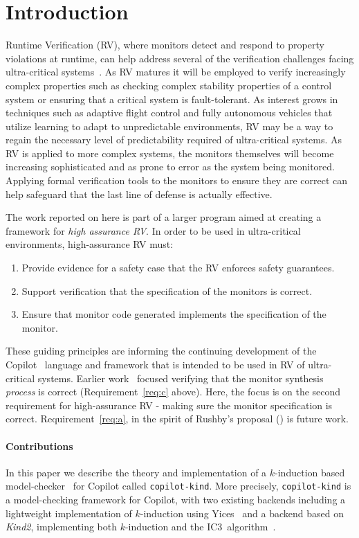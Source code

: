 \section{Introduction}\label{sec:intro}
Runtime Verification (RV), where monitors detect and respond to
property violations at runtime, can help address several of the
verification challenges facing ultra-critical
systems~\cite{pike-rv-11,rvRushby}.  As RV matures it will be employed to
verify increasingly complex properties such as checking complex
stability properties of a control system or ensuring that a critical
system is fault-tolerant. As interest grows in techniques
such as adaptive flight control and fully autonomous vehicles that
utilize learning to adapt to unpredictable environments, RV may be a
way to regain the necessary level of predictability required of
ultra-critical systems.  As RV is applied to more complex systems, the
monitors themselves will become increasing sophisticated and as prone to error
as the system being monitored.  Applying formal verification
tools to the monitors to ensure they are correct can help safeguard
that the last line of defense is actually effective.

 The work reported on here is part of a larger
program aimed at creating a framework for \emph{high assurance RV}. In
order to be used in ultra-critical environments, high-assurance RV
must:
\begin{enumerate}
\item \label{req:a} Provide evidence for a safety case that the RV enforces safety guarantees.
\item \label{req:b} Support verification that the specification of the monitors
  is correct.
\item \label{req:c} Ensure that monitor code generated implements the specification of the
monitor.
\end{enumerate}

\noindent
These guiding principles are informing the continuing development of the
Copilot~\cite{copilot,pike-isse-13} language and framework that is intended to
be used in RV of ultra-critical systems.  Earlier work~\cite{pike-icfp-12}
focused verifying that the monitor synthesis \emph{process} is correct
(Requirement~\ref{req:c} above). Here, the focus
is on the second requirement for high-assurance RV - making sure the monitor
specification is correct. Requirement~\ref{req:a}, in the spirit of Rushby's
proposal (\cite{rvRushby}) is future work.

\paragraph{Contributions}
In this paper we describe the theory and implementation of a $k$-induction based
model-checker~\cite{Sheeran00,EenS03} for Copilot called
\texttt{copilot-kind}. More precisely, \texttt{copilot-kind} is a model-checking
framework for Copilot, with two existing backends including a lightweight
implementation of $k$-induction using Yices~\cite{Dutertre:cav2014} and a backend based on
\emph{Kind2}, implementing both $k$-induction and the IC3~algorithm~\cite{Somenzi-FMCAD11}.

